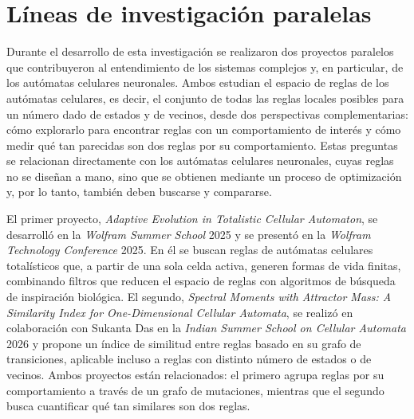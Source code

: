 \chapter{Líneas de investigación paralelas}

Durante el desarrollo de esta investigación se realizaron dos proyectos paralelos que contribuyeron al entendimiento de los sistemas complejos y, en particular, de los autómatas celulares neuronales. Ambos estudian el espacio de reglas de los autómatas celulares, es decir, el conjunto de todas las reglas locales posibles para un número dado de estados y de vecinos, desde dos perspectivas complementarias: cómo explorarlo para encontrar reglas con un comportamiento de interés y cómo medir qué tan parecidas son dos reglas por su comportamiento. Estas preguntas se relacionan directamente con los autómatas celulares neuronales, cuyas reglas no se diseñan a mano, sino que se obtienen mediante un proceso de optimización y, por lo tanto, también deben buscarse y compararse.

El primer proyecto, \textit{Adaptive Evolution in Totalistic Cellular Automaton}, se desarrolló en la \textit{Wolfram Summer School} 2025 y se presentó en la \textit{Wolfram Technology Conference} 2025. En él se buscan reglas de autómatas celulares totalísticos que, a partir de una sola celda activa, generen formas de vida finitas, combinando filtros que reducen el espacio de reglas con algoritmos de búsqueda de inspiración biológica. El segundo, \textit{Spectral Moments with Attractor Mass: A Similarity Index for One-Dimensional Cellular Automata}, se realizó en colaboración con Sukanta Das en la \textit{Indian Summer School on Cellular Automata} 2026 y propone un índice de similitud entre reglas basado en su grafo de transiciones, aplicable incluso a reglas con distinto número de estados o de vecinos. Ambos proyectos están relacionados: el primero agrupa reglas por su comportamiento a través de un grafo de mutaciones, mientras que el segundo busca cuantificar qué tan similares son dos reglas.
